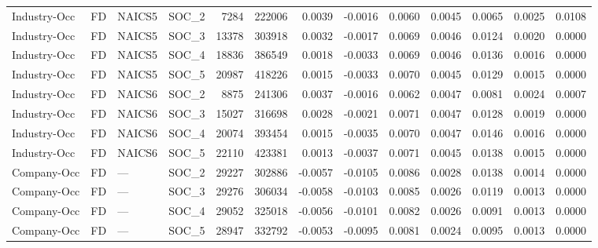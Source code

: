 \begin{table}
\begin{tabular}{lllrrrrrrrrr}
Industry-Occ & FD & NAICS5 & SOC_2 & 7284 & 222006 & 0.0039 & -0.0016 & 0.0060 & 0.0045 & 0.0065 & 0.0025 & 0.0108 \\
Industry-Occ & FD & NAICS5 & SOC_3 & 13378 & 303918 & 0.0032 & -0.0017 & 0.0069 & 0.0046 & 0.0124 & 0.0020 & 0.0000 \\
Industry-Occ & FD & NAICS5 & SOC_4 & 18836 & 386549 & 0.0018 & -0.0033 & 0.0069 & 0.0046 & 0.0136 & 0.0016 & 0.0000 \\
Industry-Occ & FD & NAICS5 & SOC_5 & 20987 & 418226 & 0.0015 & -0.0033 & 0.0070 & 0.0045 & 0.0129 & 0.0015 & 0.0000 \\
Industry-Occ & FD & NAICS6 & SOC_2 & 8875 & 241306 & 0.0037 & -0.0016 & 0.0062 & 0.0047 & 0.0081 & 0.0024 & 0.0007 \\
Industry-Occ & FD & NAICS6 & SOC_3 & 15027 & 316698 & 0.0028 & -0.0021 & 0.0071 & 0.0047 & 0.0128 & 0.0019 & 0.0000 \\
Industry-Occ & FD & NAICS6 & SOC_4 & 20074 & 393454 & 0.0015 & -0.0035 & 0.0070 & 0.0047 & 0.0146 & 0.0016 & 0.0000 \\
Industry-Occ & FD & NAICS6 & SOC_5 & 22110 & 423381 & 0.0013 & -0.0037 & 0.0071 & 0.0045 & 0.0138 & 0.0015 & 0.0000 \\
Company-Occ & FD & — & SOC_2 & 29227 & 302886 & -0.0057 & -0.0105 & 0.0086 & 0.0028 & 0.0138 & 0.0014 & 0.0000 \\
Company-Occ & FD & — & SOC_3 & 29276 & 306034 & -0.0058 & -0.0103 & 0.0085 & 0.0026 & 0.0119 & 0.0013 & 0.0000 \\
Company-Occ & FD & — & SOC_4 & 29052 & 325018 & -0.0056 & -0.0101 & 0.0082 & 0.0026 & 0.0091 & 0.0013 & 0.0000 \\
Company-Occ & FD & — & SOC_5 & 28947 & 332792 & -0.0053 & -0.0095 & 0.0081 & 0.0024 & 0.0095 & 0.0013 & 0.0000 \\
\bottomrule
\end{tabular}
\end{table}
